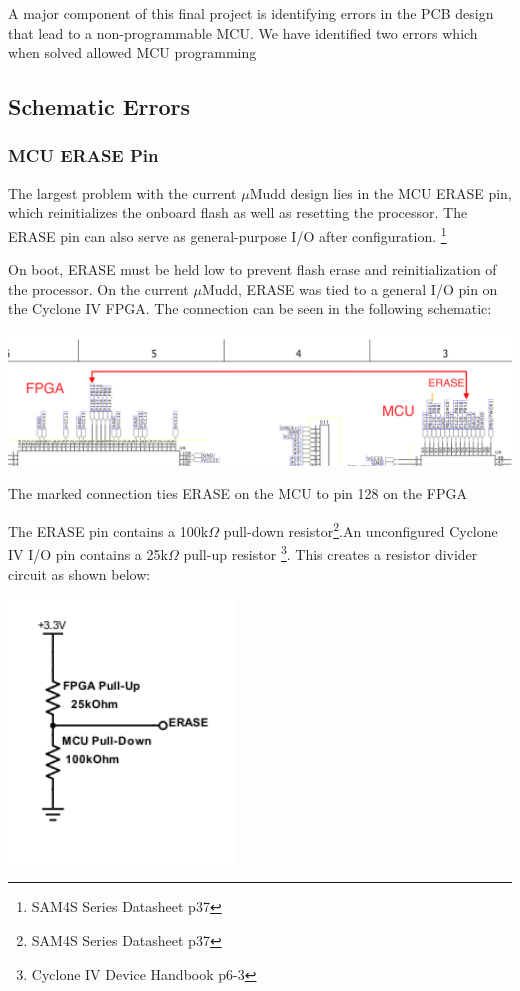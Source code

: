 \documentclass[12pt]{article}
\begin{document}
A major component of this final project is identifying errors in the PCB design that lead to a non-programmable MCU. We have identified two errors which when solved allowed MCU programming

\subsection{Schematic Errors}

\subsubsection{MCU ERASE Pin}
The largest problem with the current $\mu$Mudd design lies in the MCU ERASE pin, which reinitializes the onboard flash as well as resetting the processor. The ERASE pin can also serve as general-purpose I/O after configuration. \footnote{SAM4S Series Datasheet p37}

On boot, ERASE must be held low to prevent flash erase and reinitialization of the processor. On the current $\mu$Mudd, ERASE was tied to a general I/O pin on the Cyclone IV FPGA. The connection can be seen in the following schematic:

\begin{center}
	\includegraphics[width=16cm]{erase_error.png}
	\caption{The marked connection ties ERASE on the MCU to pin 128 on the FPGA}
\end{center}

The ERASE pin contains a 100k$\Omega$ pull-down resistor\footnote{SAM4S Series Datasheet p37}.An unconfigured Cyclone IV I/O pin contains a 25k$\Omega$ pull-up resistor \footnote{Cyclone IV Device Handbook p6-3}. This creates a resistor divider circuit as shown below:

\begin{center}
	\includegraphics[width=6cm]{resistor_divider.png}
\end{center}
\end{document}
